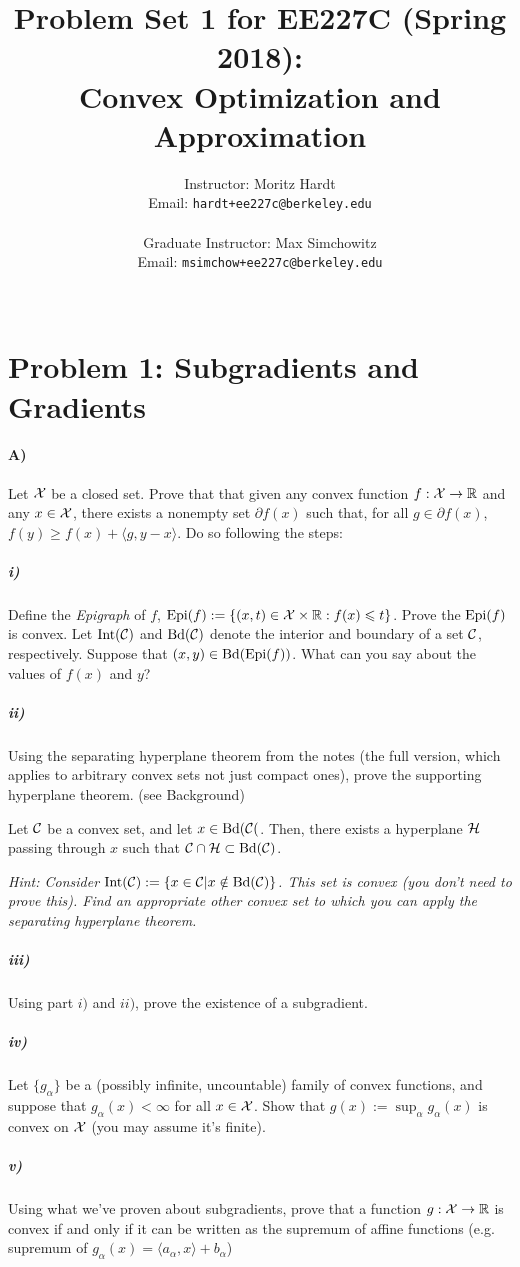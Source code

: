 \documentclass[12pt]{article}
\title{Problem Set 1 for EE227C (Spring 2018):\\
 Convex Optimization and Approximation }
\author{Instructor: Moritz Hardt\\
{\small Email: \tt hardt+ee227c@berkeley.edu}\\ ~\\
Graduate Instructor: Max Simchowitz\\
{\small Email: \tt msimchow+ee227c@berkeley.edu}\\ ~\\
}
\begin{document}
\maketitle




\section*{Problem 1: Subgradients and Gradients}
\paragraph{A)} Let ${\cal X}$ be a closed set. Prove that that given any convex function $f: {\cal X} \to \mathbb{R}$ and any $x \in {\cal X}$, there exists a nonempty set $\partial f(x)$ such that, for all $g \in \partial f(x)$, $f(y) \ge f(x) + \langle g, y - x \rangle$. Do so following the steps:
\subparagraph{i)} Define the \emph{Epigraph} of $f$, $\mathrm{Epi}(f) := \{(x,t) \in {\cal X} \times \mathbb{R}: f(x) \leqslant t\}$. Prove the $\mathrm{Epi}(f)$ is convex. Let $\mathrm{Int}({\cal C})$ and $\mathrm{Bd}({\cal C})$ denote the interior and boundary of a set ${\cal C}$, respectively. Suppose that $(x,y) \in \mathrm{Bd}(\mathrm{Epi}(f))$. What can you say about the values of $f(x)$ and $y$?

\subparagraph{ii)} Using the separating hyperplane theorem from the notes (the full version, which applies to arbitrary convex sets not just compact ones), prove the supporting hyperplane theorem.  (see Background)
\begin{theorem*} Let ${\cal C}$ be a convex set, and let $x \in \mathrm{Bd}({\cal C}($. Then, there exists a hyperplane ${\cal H}$ passing through $x$ such that ${\cal C} \cap {\cal H} \subset \mathrm{Bd}({\cal C}) $. 
\end{theorem*}
\emph{Hint: Consider $\mathrm{Int}({\cal C}) := \{x \in {\cal C} | x \notin \mathrm{Bd}({\cal C})\}$. This set is convex (you don't need to prove this). Find an appropriate other convex set to which you can apply the separating hyperplane theorem.}

\subparagraph{iii)} Using part $i)$ and $ii)$, prove the existence of a subgradient. 

\subparagraph{iv)} Let $\{g_{\alpha}\}$ be a (possibly infinite, uncountable) family of convex functions, and suppose that $g_{\alpha}(x) < \infty$ for all $x \in {\cal X}$. Show that $g(x) := \sup_{\alpha} g_{\alpha}(x)$ is convex on ${\cal X}$ (you may assume it's finite).

\subparagraph{v)} Using what we've proven about subgradients, prove that a function $g: {\cal X} \to \mathbb{R}$ is convex if and only if it can be written as the supremum of affine functions (e.g. supremum of  $g_{\alpha}(x) = \langle a_{\alpha}, x \rangle + b_{\alpha}$)
\end{document}
